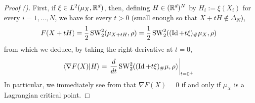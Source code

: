 \begin{proof}[Proof ()]
    First, if $\xi \in L^2(\mu_X,\mathbb R^d)$, then, defining $H \in (\mathbb R^d)^N$ by $H_i := \xi(X_i)$ for every $i = 1,\ldots,N$, we have for every $t > 0$ (small enough so that $X + tH \notin \Delta_N$),
    \begin{equation} F(X + tH) = \frac 12 \mathop{\mathrm{SW}}\nolimits^2_2(\mu_{X+tH}, \rho) = \frac 12 \mathop{\mathrm{SW}}\nolimits^2_2((\mathop{\mathrm{Id}}\nolimits+t\xi)_\#\mu_X,\rho) \end{equation}
    from which we deduce, by taking the right derivative at $t = 0$,
    \begin{equation} \langle\nabla F(X)|H\rangle = \left. \frac{d}{dt} \mathop{\mathrm{SW}}\nolimits^2_2((\mathop{\mathrm{Id}}\nolimits+t\xi)_\#\mu,\rho) \right|_{t=0^+} \end{equation}
    In particular, we immediately see from  that $\nabla F(X) = 0$ if and only if $\mu_X$ is a Lagrangian critical point. \newline


\end{proof}
